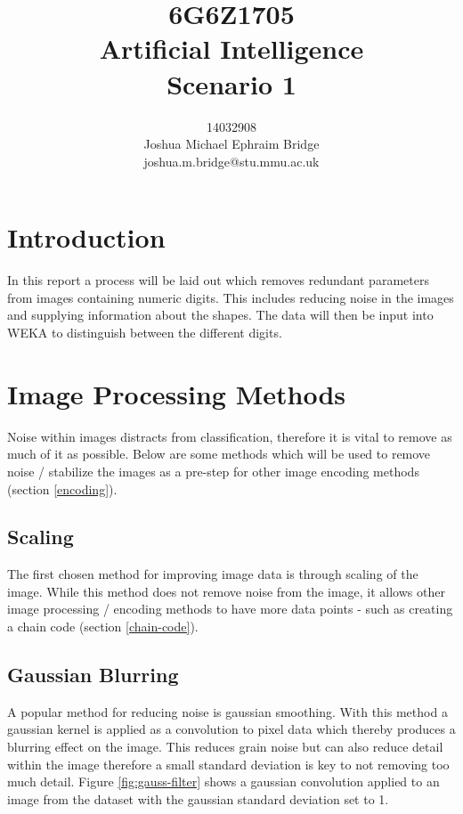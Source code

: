 \documentclass[12pt]{article}
\title{\vspace{2cm}6G6Z1705\\\textbf{Artificial Intelligence}\\\vspace{2cm}Scenario 1\\\vspace{2cm}}
\author{14032908\\Joshua Michael Ephraim Bridge\\joshua.m.bridge@stu.mmu.ac.uk\\\vspace{1cm}}
\begin{document}
\maketitle

\newpage


\onehalfspacing

\section{Introduction}
In this report a process will be laid out which removes redundant parameters from images containing numeric digits. This includes reducing noise in the images and supplying information about the shapes. The data will then be input into WEKA to distinguish between the different digits.

\section{Image Processing Methods}
  Noise within images distracts from classification, therefore it is vital to remove as much of it as possible. Below are some methods which will be used to remove noise / stabilize the images as a pre-step for other image encoding methods (section \ref{encoding}).

  \subsection{Scaling}
    The first chosen method for improving image data is through scaling of the image. While this method does not remove noise from the image, it allows other image processing / encoding methods to have more data points - such as creating a chain code (section \ref{chain-code}).

  \subsection{Gaussian Blurring} \label{sec:gauss-blur}
    A popular method for reducing noise is gaussian smoothing. With this method a gaussian kernel is applied as a convolution to pixel data which thereby produces a blurring effect on the image. This reduces grain noise but can also reduce detail within the image therefore a small standard deviation is key to not removing too much detail. Figure \ref{fig:gauss-filter} shows a gaussian convolution applied to an image from the dataset with the gaussian standard deviation set to 1.
\end{document}
